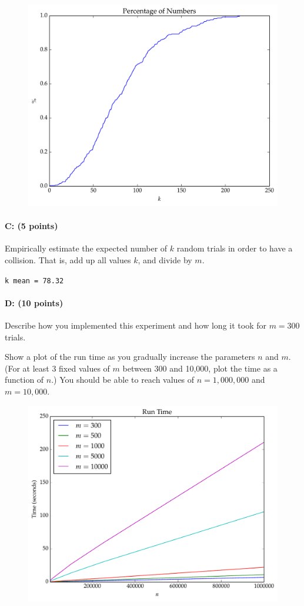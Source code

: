 \documentclass[11pt]{article}
\begin{document}
\begin{figure}[H]
\centering
\includegraphics[width=.75\textwidth]{prob1_percentages.pdf}
\end{figure}

\paragraph{C: (5 points)}  
Empirically estimate the expected number of $k$ random trials in order to have a collision.  That is, add up all values $k$, and divide by $m$.  

\verb~k mean = 78.32~

\paragraph{D: (10 points)}  
Describe how you implemented this experiment and how long it took for $m = 300$ trials.  

Show a plot of the run time as you gradually increase the parameters $n$ and $m$.  
(For at least 3 fixed values of $m$ between 300 and 10,000, plot the time as a function of $n$.)
You should be able to reach values of $n = 1{,}000{,}000$ and $m = 10{,}000$. 

\begin{figure}[H]
\centering
\includegraphics[width=.73\textwidth]{prob1_runtime.pdf}
\end{figure} 
\end{document}
